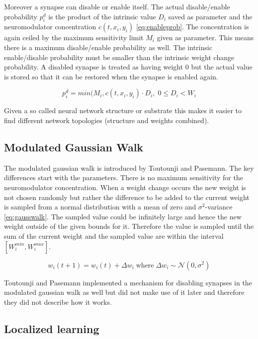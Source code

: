 \documentclass[12pt,twoside]{scrartcl}
\theoremstyle{plain}
\theoremstyle{definition}
\theoremstyle{remark}
\begin{document}
Moreover a synapse can disable or enable itself. The actual disable/enable
probability \(p_i^d\) is the product of the intrinsic value \(D_i\) saved as
parameter and the neuromodulator concentration \(c(t, x_i, y_i)\) \eqref{eq:enableprob}.
The concentration is again ceiled by the maximum sensitivity limit \(M_i\) given
as parameter. This means there is a maximum disable/enable probability as well.
The intrinsic enable/disable probability must be smaller than the intrinsic weight
change probability. A disabled synapse is treated as having weight 0 but the actual
value is stored so that it can be restored when the synapse is enabled again.

\begin{equation}\label{eq:enableprob}
    p_i^d = min(M_i, c(t, x_i, y_i) \cdot D_i,\; 0 \leq D_i < W_i
\end{equation}

Given a so called neural network structure or substrate this makes it easier
to find different network topologies (structure and weights combined).

\subsection{Modulated Gaussian Walk}
\label{subsec:mgw}

The modulated gaussian walk is introduced by Toutounji and Pasemann. The key differences
start with the parameters. There is no maximum sensitivity for the neuromodulator
concentration. When a weight change occurs the new weight is not chosen randomly
but rather the difference to be added to the current weight is sampled from a
normal distribution with a mean of zero and \(\sigma^2\)-variance \eqref{eq:gausswalk}.
The sampled value could be infinitely large and hence the new weight outside of
the given bounds for it. Therefore the value is sampled until the sum of the
current weight and the sampled value are within the interval \([W_i^{min}, W_i^{max}]\).

\begin{equation}\label{eq:gausswalk}
    w_i (t + 1) = w_i (t) + \Delta w_i \;\text{where}\; \Delta w_i \sim \mathcal{N}(0, \sigma^2)
\end{equation}

Toutounji and Pasemann implemented a mechanism for disabling synapses
in the modulated gaussian walk as well but did not make use of it later and
therefore they did not describe how it works.

\subsection{Localized learning}
\label{subsec:diffusion}
\end{document}
